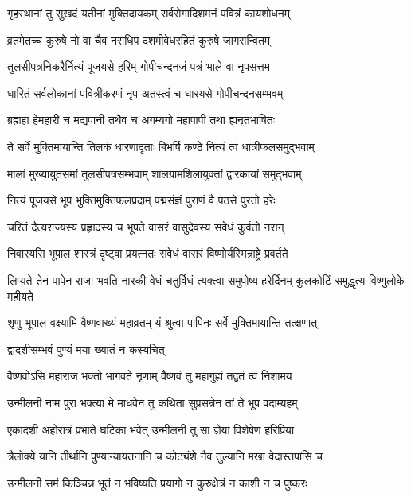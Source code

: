 \twolineshloka
{गृहस्थानां तु सुखदं यतीनां मुक्तिदायकम्}
{सर्वरोगादिशमनं पवित्रं कायशोधनम्}%

\twolineshloka
{व्रतमेतच्च कुरुषे नो वा चैव नराधिप}
{दशमीवेधरहितं कुरुषे जागरान्वितम्}%

\twolineshloka
{तुलसीपत्रनिकरैर्नित्यं पूजयसे हरिम्}
{गोपीचन्दनजं पत्रं भाले वा नृपसत्तम}%

\twolineshloka
{धारितं सर्वलोकानां पवित्रीकरणं नृप}
{अतस्त्वं च धारयसे गोपीचन्दनसम्भवम्}%

\twolineshloka
{ब्रह्महा हेमहारी च मद्यपानी तथैव च}
{अगम्यगो महापापी तथा ह्यनृतभाषितः}%

\twolineshloka
{ते सर्वे मुक्तिमायान्ति तिलकं धारणादृताः}
{बिभर्षि कण्ठे नित्यं त्वं धात्रीफलसमुद्भवाम्}%

\twolineshloka
{मालां मुख्यायुतसमां तुलसीपत्रसम्भवाम्}
{शालग्रामशिलायुक्तां द्वारकायां समुद्भवाम्}%

\twolineshloka
{नित्यं पूजयसे भूप भुक्तिमुक्तिफलप्रदाम्}
{पद्मसंज्ञं पुराणं वै पठसे पुरतो हरेः}%

\twolineshloka
{चरितं दैत्यराज्यस्य प्रह्लादस्य च भूपते}
{वासरं वासुदेवस्य सवेधं कुर्वतो नरान्}%

\twolineshloka
{निवारयसि भूपाल शास्त्रं दृष्ट्वा प्रयत्नतः}
{सवेधं वासरं विष्णोर्यस्मिन्राष्ट्रे प्रवर्तते}%

\threelineshloka
{लिप्यते तेन पापेन राजा भवति नारकी}
{वेधं चतुर्विधं त्यक्त्वा समुपोष्य हरेर्दिनम्}
{कुलकोटिं समुद्धृत्य विष्णुलोके महीयते}%


\twolineshloka
{शृणु भूपाल वक्ष्यामि वैष्णवाख्यं महाव्रतम्}
{यं श्रुत्वा पापिनः सर्वे मुक्तिमायान्ति तत्क्षणात्}%

\onelineshloka
{द्वादशीसम्भवं पुण्यं मया ख्यातं न कस्यचित्}%

\twolineshloka
{वैष्णवोऽसि महाराज भक्तो भागवते नृणाम्}
{वैष्णवं तु महागुह्यं तद्व्रतं त्वं निशामय}%

\twolineshloka
{उन्मीलनी नाम पुरा भक्त्या मे माधवेन तु}
{कथिता सुप्रसन्नेन तां ते भूप वदाम्यहम्}%

\twolineshloka
{एकादशी अहोरात्रं प्रभाते घटिका भवेत्}
{उन्मीलनी तु सा ज्ञेया विशेषेण हरिप्रिया}%

\twolineshloka
{त्रैलोक्ये यानि तीर्थानि पुण्यान्यायतनानि च}
{कोट्यंशे नैव तुल्यानि मखा वेदास्तपांसि च}%

\twolineshloka
{उन्मीलनी समं किञ्चिन्न भूतं न भविष्यति}
{प्रयागो न कुरुक्षेत्रं न काशी न च पुष्करः}%


